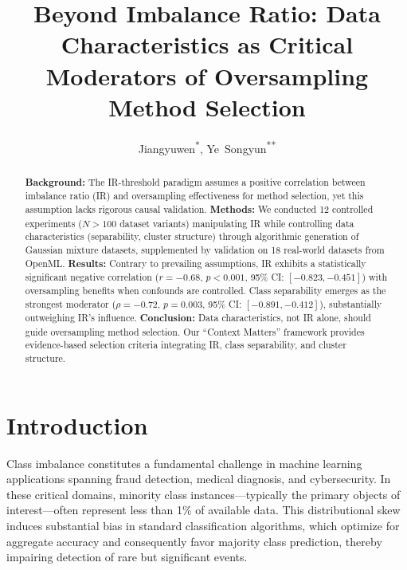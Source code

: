 \documentclass{ijSmartGrid}
\title{Beyond Imbalance Ratio: Data Characteristics as Critical Moderators of Oversampling Method Selection}
\author{%
  Jiangyuwen\textsuperscript{*}\orcidlink{0009-0001-4022-1436},
  Ye~Songyun\textsuperscript{**}\orcidlink{0009-0009-5048-3147}%
}
\theoremstyle{definition}
\begin{document}
\maketitle

\setlength{\parindent}{0.63cm}
\setlength{\parskip}{6pt}

\begin{abstract}
\textbf{Background:} The IR-threshold paradigm assumes a positive correlation between imbalance ratio (IR) and oversampling effectiveness for method selection, yet this assumption lacks rigorous causal validation. \textbf{Methods:} We conducted 12 controlled experiments ($N>100$ dataset variants) manipulating IR while controlling data characteristics (separability, cluster structure) through algorithmic generation of Gaussian mixture datasets, supplemented by validation on 18 real-world datasets from OpenML. \textbf{Results:} Contrary to prevailing assumptions, IR exhibits a statistically significant negative correlation ($r=-0.68$, $p<0.001$, 95\% CI: $[-0.823, -0.451]$) with oversampling benefits when confounds are controlled. Class separability emerges as the strongest moderator ($\rho=-0.72$, $p=0.003$, 95\% CI: $[-0.891, -0.412]$), substantially outweighing IR's influence. \textbf{Conclusion:} Data characteristics, not IR alone, should guide oversampling method selection. Our ``Context Matters'' framework provides evidence-based selection criteria integrating IR, class separability, and cluster structure.
\end{abstract}

\setlength{\parindent}{0.63cm}
\setlength{\parskip}{6pt}


\section{Introduction}
\indent Class imbalance constitutes a fundamental challenge in machine learning applications spanning fraud detection, medical diagnosis, and cybersecurity. In these critical domains, minority class instances---typically the primary objects of interest---often represent less than 1\% of available data. This distributional skew induces substantial bias in standard classification algorithms, which optimize for aggregate accuracy and consequently favor majority class prediction, thereby impairing detection of rare but significant events.
\end{document}
